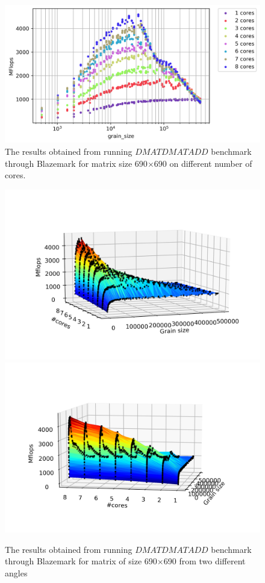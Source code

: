 \vspace{\baselineskip}	
\begin{figure}[H]
	\centering
	\hspace*{-2cm}\includegraphics[scale=.75]{images/fig13.png}
	\caption{The results obtained from running $DMATDMATADD$ benchmark through Blazemark for matrix size 690$\times$690 on different number of cores.}	
	\label{fig9}
\end{figure}

\vspace{\baselineskip}	
\begin{figure}[H]
	\centering
	{\includegraphics[scale=0.7]{images/fig2.png}}
	{\includegraphics[scale=0.7]{images/fig3.png}}
	\caption{The results obtained from running $DMATDMATADD$ benchmark through Blazemark for matrix of size 690$\times$690 from two different angles}	
	\label{fig1}
\end{figure}

